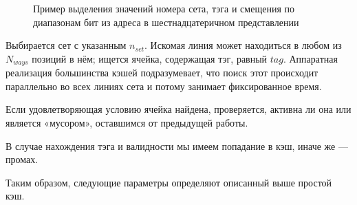 \begin{enumerate*}
\begin{figure}[htb]
    \caption[Пример выделения значений номера сета, тэга и смещения из адреса]{Пример выделения значений номера сета, тэга и смещения по диапазонам бит из адреса в шестнадцатеричном представлении}
    \label{fig:set-tag-flags}
\end{figure}


\item Выбирается сет с указанным $n_{set}$. Искомая линия может находиться в любом из $N_{ways}$ позиций в нём; ищется ячейка, содержащая тэг, равный $tag$. Аппаратная реализация большинства кэшей подразумевает, что поиск этот происходит параллельно во всех линиях сета и потому занимает фиксированное время.

\item Если удовлетворяющая условию ячейка найдена, проверяется, активна ли она или является «мусором», оставшимся от предыдущей работы.

\item В случае нахождения тэга и валидности мы имеем попадание в кэш, иначе же --- промах.
\end{enumerate*}

Таким образом, следующие параметры определяют описанный выше простой кэш.

